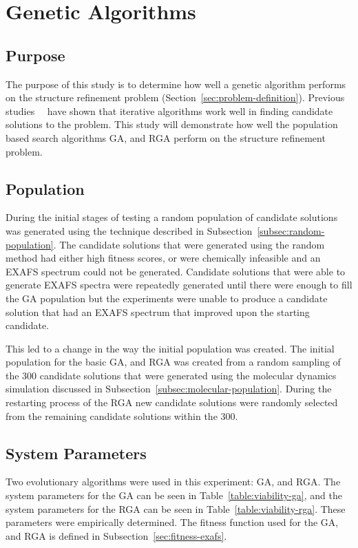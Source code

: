 \section{Genetic Algorithms}
\label{sec:ga-experiment}

\subsection{Purpose}

The purpose of this study is to determine how well a genetic algorithm performs on the structure refinement problem (Section~\ref{sec:problem-definition}). Previous studies~\cite{sproviero2008model}~\cite{luber2011s1} have shown that iterative algorithms work well in finding candidate solutions to the problem. This study will demonstrate how well the population based search algorithms GA, and RGA perform on the structure refinement problem.

\subsection{Population}

During the initial stages of testing a random population of candidate solutions was generated using the technique described in Subsection~\ref{subsec:random-population}. The candidate solutions that were generated using the random method had either high fitness scores, or were chemically infeasible and an EXAFS spectrum could not be generated. Candidate solutions that were able to generate EXAFS spectra were repeatedly generated until there were enough to fill the GA population but the experiments were unable to produce a candidate solution that had an EXAFS spectrum that improved upon the starting candidate.

This led to a change in the way the initial population was created. The initial population for the basic GA, and RGA was created from a random sampling of the 300 candidate solutions that were generated using the molecular dynamics simulation discussed in Subsection~\ref{subsec:molecular-population}. During the restarting process of the RGA new candidate solutions were randomly selected from the remaining candidate solutions within the 300.

\subsection{System Parameters}

Two evolutionary algorithms were used in this experiment: GA, and RGA. The system parameters for the GA can be seen in Table~\ref{table:viability-ga}, and the system parameters for the RGA can be seen in Table~\ref{table:viability-rga}. These parameters were empirically determined. The fitness function used for the GA, and RGA is defined in Subsection~\ref{sec:fitness-exafs}.

